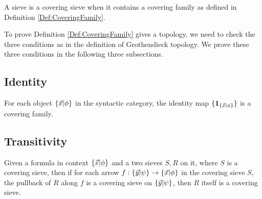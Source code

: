 \begin{definition}
  A sieve is a covering sieve when it contains a covering family as defined in Definition \ref{Def:CoveringFamily}.
\end{definition}

To prove Definition \ref{Def:CoveringFamily} gives a topology, we need to check the three conditions as in the definition of Grothendieck
topology.
We prove these three conditions in the following three subsections.

\subsection{Identity}
\begin{lemma}
  For each object $\{ \vec{x} | \phi \}$ in the syntactic category, the identity map $\{\mathbf{1}_{\{ \vec{x} | \phi \}}\}$ is a covering family.
\end{lemma}

\subsection{Transitivity}
\begin{lemma}[Transitivity]
  Given a formula in context $\{ \vec{x} | \phi \}$ and a two sieves $S,R$ on it, where $S$ is a covering sieve, then if for each arrow $f:\{ \vec{y} | \psi \}\to\{ \vec{x} | \phi \}$ in the
  covering sieve $S$, the pullback of $R$ along $f$ is a covering sieve on $\{ \vec{y} | \psi \}$, then $R$ itself is a covering sieve.
\end{lemma}

